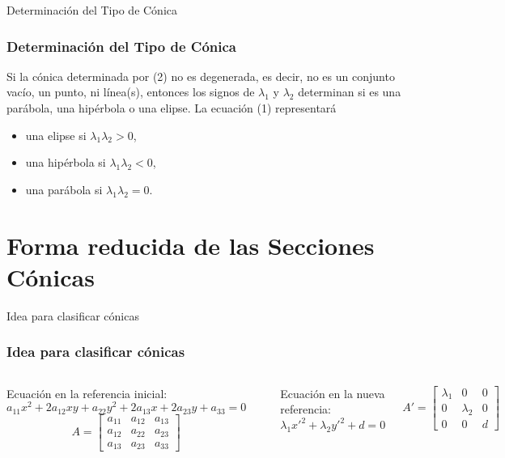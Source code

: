 \documentclass[xcolor={dvipsnames},aspectratio=169,10pt]{beamer}
\begin{document}
\begin{frame}{Determinación del Tipo de Cónica}
  \frametitle{Determinación del Tipo de Cónica}
  Si la cónica determinada por (2) no es degenerada, es decir, no es un conjunto vacío, un punto, ni línea(s), entonces los signos de $\lambda_1$ y $\lambda_2$ determinan si es una parábola, una hipérbola o una elipse. La ecuación (1) representará
  \begin{itemize}
    \item una elipse si $\lambda_1\lambda_2 > 0$,
    \item una hipérbola si $\lambda_1\lambda_2 < 0$,
    \item una parábola si $\lambda_1\lambda_2 = 0$.
  \end{itemize}
\end{frame}

\section{Forma reducida de las Secciones Cónicas}
\begin{frame}{Idea para clasificar cónicas}
  \frametitle{Idea para clasificar cónicas}
  
  \begin{columns}
    Ecuación en la referencia inicial:
    \begin{equation*}
      a_{11}x^2 + 2a_{12}xy + a_{22}y^2 + 2a_{13}x + 2a_{23}y + a_{33} = 0
    \end{equation*}
    \begin{equation*}
      A = \begin{bmatrix}
        a_{11} & a_{12} & a_{13} \\
        a_{12} & a_{22} & a_{23} \\
        a_{13} & a_{23} & a_{33}
      \end{bmatrix}
    \end{equation*}

    \begin{center}
    \end{center}

    Ecuación en la nueva referencia:
    \begin{equation*}
      \lambda_1x'^2 + \lambda_2y'^2 + d= 0
    \end{equation*}

    \begin{equation*}
      A' = \begin{bmatrix}
        \lambda_1 & 0 & 0 \\
        0 & \lambda_2 & 0 \\
        0 & 0 & d
      \end{bmatrix}
    \end{equation*}
  \end{columns}
\end{frame}
\end{document}
